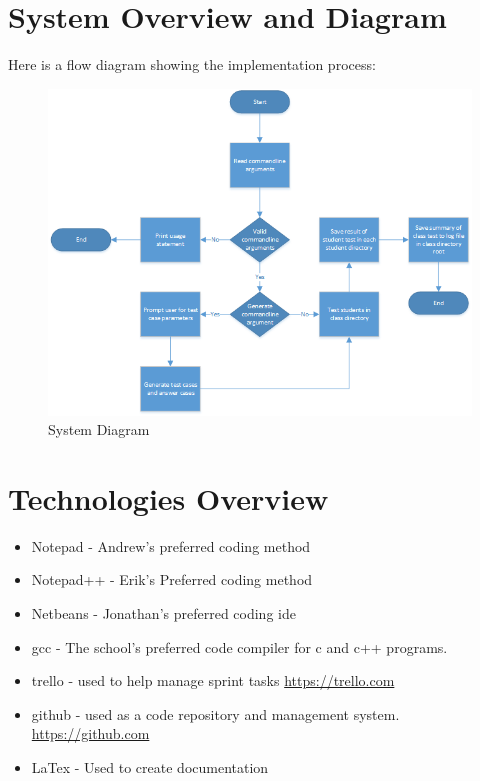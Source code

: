 \section{System Overview and Diagram}
Here is a flow diagram showing the implementation process:

\begin{figure}[tbh]
\begin{center}
\includegraphics[width=1\textwidth]{./SystemDiagram}
\end{center}
\caption{System Diagram \label{systemdiagram}}
\end{figure}

\section{Technologies Overview}
\begin{itemize}
\item Notepad - Andrew's preferred coding method
\item Notepad++ - Erik's Preferred coding method
\item Netbeans - Jonathan's preferred coding ide
\item gcc - The school's preferred code compiler for c and c++ programs.
\item trello - used to help manage sprint tasks \url{https://trello.com}
\item github - used as a code repository and management system. \url{https://github.com}
\item LaTex - Used to create documentation
\end{itemize}

